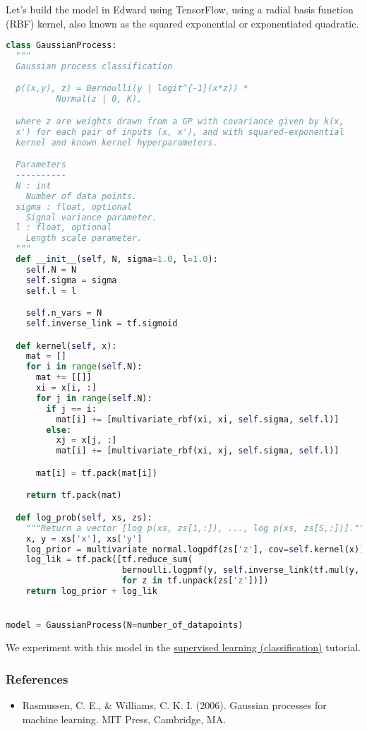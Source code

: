 Let's build the model in Edward using TensorFlow, using a radial basis function
(RBF) kernel, also known as the squared exponential or exponentiated quadratic.
\begin{lstlisting}[language=Python]
class GaussianProcess:
  """
  Gaussian process classification

  p((x,y), z) = Bernoulli(y | logit^{-1}(x*z)) *
          Normal(z | 0, K),

  where z are weights drawn from a GP with covariance given by k(x,
  x') for each pair of inputs (x, x'), and with squared-exponential
  kernel and known kernel hyperparameters.

  Parameters
  ----------
  N : int
    Number of data points.
  sigma : float, optional
    Signal variance parameter.
  l : float, optional
    Length scale parameter.
  """
  def __init__(self, N, sigma=1.0, l=1.0):
    self.N = N
    self.sigma = sigma
    self.l = l

    self.n_vars = N
    self.inverse_link = tf.sigmoid

  def kernel(self, x):
    mat = []
    for i in range(self.N):
      mat += [[]]
      xi = x[i, :]
      for j in range(self.N):
        if j == i:
          mat[i] += [multivariate_rbf(xi, xi, self.sigma, self.l)]
        else:
          xj = x[j, :]
          mat[i] += [multivariate_rbf(xi, xj, self.sigma, self.l)]

      mat[i] = tf.pack(mat[i])

    return tf.pack(mat)

  def log_prob(self, xs, zs):
    """Return a vector [log p(xs, zs[1,:]), ..., log p(xs, zs[S,:])]."""
    x, y = xs['x'], xs['y']
    log_prior = multivariate_normal.logpdf(zs['z'], cov=self.kernel(x))
    log_lik = tf.pack([tf.reduce_sum(
                       bernoulli.logpmf(y, self.inverse_link(tf.mul(y, z))))
                       for z in tf.unpack(zs['z'])])
    return log_prior + log_lik


model = GaussianProcess(N=number_of_datapoints)
\end{lstlisting}

We experiment with this model in the
\href{tut_supervised_classification.html}{supervised learning (classification)} tutorial.

\subsubsection{References}\label{references}

\begin{itemize}
\item
  Rasmussen, C. E., \& Williams, C. K. I. (2006). Gaussian processes
  for machine learning. MIT Press, Cambridge, MA.
\end{itemize}
